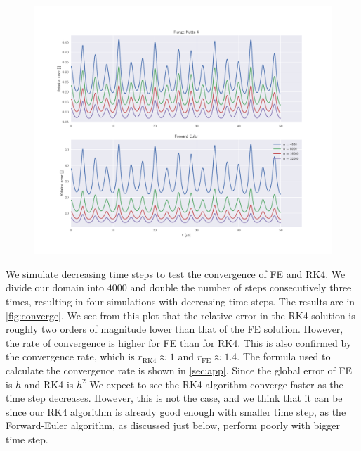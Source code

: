 \begin{figure}
\centering
\includegraphics[scale = 1]{../figures/convergence.pdf}
\caption{}
\label{fig:converge}
\end{figure}

We simulate decreasing time steps to test the convergence of FE and RK4.
We divide our domain into $4000$ and double the number of steps consecutively three times,
resulting in four simulations with decreasing time steps. The results are in \autoref{fig:converge}.
We see from this plot that the relative error in the RK4 solution is roughly two orders of magnitude lower
than that of the FE solution. However, the rate of convergence is higher for FE than for
RK4. This is also confirmed by the convergence rate, which is $r_{\text{RK4}} \approx 1$ and $r_{\text{FE}} \approx 1.4$. 
The formula used to calculate the convergence rate is shown in \autoref{sec:app}. Since the global error of FE is $h$ and RK4 is $h^2$
We expect to see the RK4 algorithm converge faster as the time step decreases. However, this is not the case, and we think that it can 
be since our RK4 algorithm is already good enough with smaller time step, as the Forward-Euler algorithm, as discussed just below,
perform poorly with bigger time step. 

